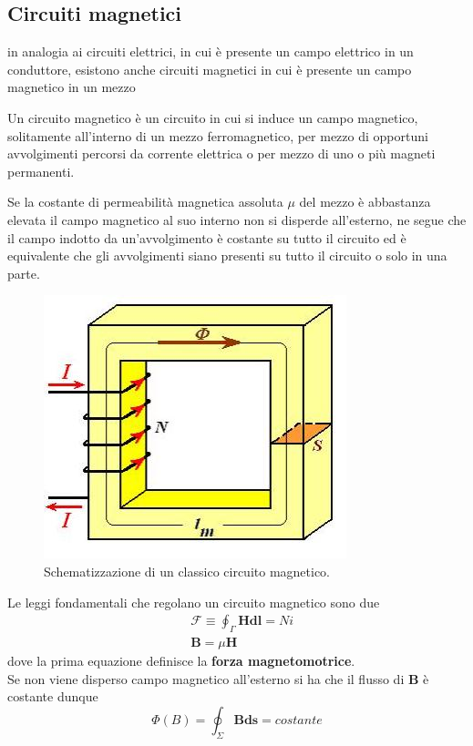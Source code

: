 \documentclass[
10pt, %
a4paper, %
oneside, %
headinclude,footinclude, %
BCOR5mm, %
]{scrartcl}
\begin{document}
\subsection{Circuiti magnetici}
in analogia ai circuiti elettrici, in cui è presente un campo elettrico in un conduttore, esistono anche circuiti magnetici in cui è presente un campo magnetico in un mezzo 
\begin{definizione}
	Un circuito magnetico è un circuito in cui si induce un campo magnetico, solitamente all'interno di un mezzo ferromagnetico, per mezzo di opportuni avvolgimenti percorsi da corrente elettrica o per mezzo di uno o più magneti permanenti.
\end{definizione}
Se la costante di permeabilità magnetica assoluta \(\mu\) del mezzo è abbastanza elevata il campo magnetico al suo interno non si disperde all'esterno, ne segue che il campo indotto da un'avvolgimento è costante su tutto il circuito ed è equivalente che gli avvolgimenti siano presenti su tutto il circuito o solo in una parte.
\begin{figure}[h!]
	\centering
	\includegraphics[width=0.6\linewidth]{../images/circuito-magnetico}
	\caption{Schematizzazione di un classico circuito magnetico.}
	\label{fig:circuito-magnetico}
\end{figure}
\FloatBarrier
Le leggi fondamentali che regolano un circuito magnetico sono due
\begin{align*}
	&\mathcal{F}\equiv\oint_{\Gamma}\mathbf{H}\mathbf{dl} = N i\\
	&\mathbf{B} = \mu\mathbf{H}
\end{align*}
dove la prima equazione definisce la \textbf{forza magnetomotrice}.\\
Se non viene disperso campo magnetico all'esterno si ha che il flusso di \(\mathbf{B}\) è costante dunque 
\[\Phi(B) = \oint_{\Sigma}\mathbf{B}\mathbf{ds} = costante\]
\end{document}
